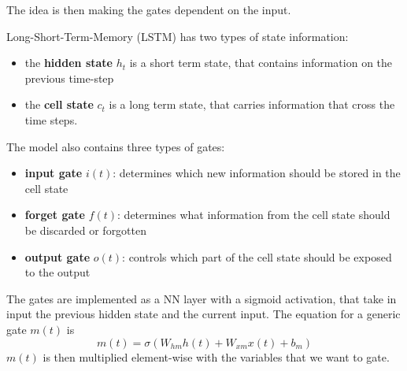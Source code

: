 \documentclass[oneside]{book}
\theoremstyle{definition}
\theoremstyle{plain}
\begin{document}
The idea is then making the gates dependent on the input. 

Long-Short-Term-Memory (LSTM) has two types of state information:
\begin{itemize}
    \item the \textbf{hidden state }$h_t$ is a short term state, that contains information on the previous time-step
    \item the\textbf{ cell state} $c_t$ is a long term state, that carries information  that cross the time steps.
\end{itemize}

The model also contains three types of gates:
\begin{itemize}
    \item \textbf{input gate} $i(t)$: determines which new information should be stored in the cell state
    \item \textbf{forget gate} $f(t)$: determines what information from the cell state should be discarded or forgotten
    \item \textbf{output gate} $o(t)$: controls which part of the cell state should be exposed to the output
\end{itemize}
The gates are implemented as a NN layer with a sigmoid activation, that take in input the previous hidden state and the current input. The equation for a generic gate $m(t)$ is
\begin{equation}\label{eqn:gate}
    m(t)=\sigma(W_{hm}h(t) + W_{xm}x(t)+b_m)
\end{equation}
$m(t)$ is then multiplied element-wise with the variables that we want to gate.
\end{document}
